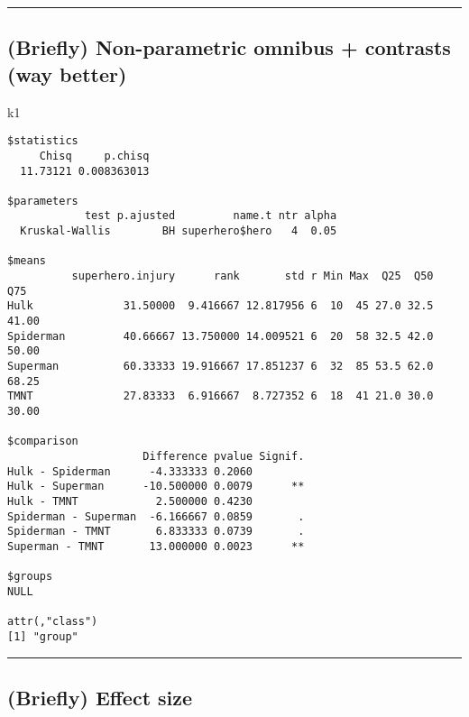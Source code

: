 \documentclass[]{article}
\newenvironment{Shaded}{\begin{snugshade}}{\end{snugshade}}
\newcommand{\NormalTok}[1]{#1}
\begin{document}
\begin{center}\rule{0.5\linewidth}{\linethickness}\end{center}

\hypertarget{briefly-non-parametric-omnibus-contrasts-way-better-1}{%
\subsection{(Briefly) Non-parametric omnibus + contrasts (way
better)}\label{briefly-non-parametric-omnibus-contrasts-way-better-1}}

\begin{Shaded}
\begin{Highlighting}[]
\NormalTok{k1}
\end{Highlighting}
\end{Shaded}

\begin{verbatim}
$statistics
     Chisq     p.chisq
  11.73121 0.008363013

$parameters
            test p.ajusted         name.t ntr alpha
  Kruskal-Wallis        BH superhero$hero   4  0.05

$means
          superhero.injury      rank       std r Min Max  Q25  Q50   Q75
Hulk              31.50000  9.416667 12.817956 6  10  45 27.0 32.5 41.00
Spiderman         40.66667 13.750000 14.009521 6  20  58 32.5 42.0 50.00
Superman          60.33333 19.916667 17.851237 6  32  85 53.5 62.0 68.25
TMNT              27.83333  6.916667  8.727352 6  18  41 21.0 30.0 30.00

$comparison
                     Difference pvalue Signif.
Hulk - Spiderman      -4.333333 0.2060        
Hulk - Superman      -10.500000 0.0079      **
Hulk - TMNT            2.500000 0.4230        
Spiderman - Superman  -6.166667 0.0859       .
Spiderman - TMNT       6.833333 0.0739       .
Superman - TMNT       13.000000 0.0023      **

$groups
NULL

attr(,"class")
[1] "group"
\end{verbatim}

\begin{center}\rule{0.5\linewidth}{\linethickness}\end{center}

\hypertarget{briefly-effect-size}{%
\subsection{(Briefly) Effect size}\label{briefly-effect-size}}
\end{document}
